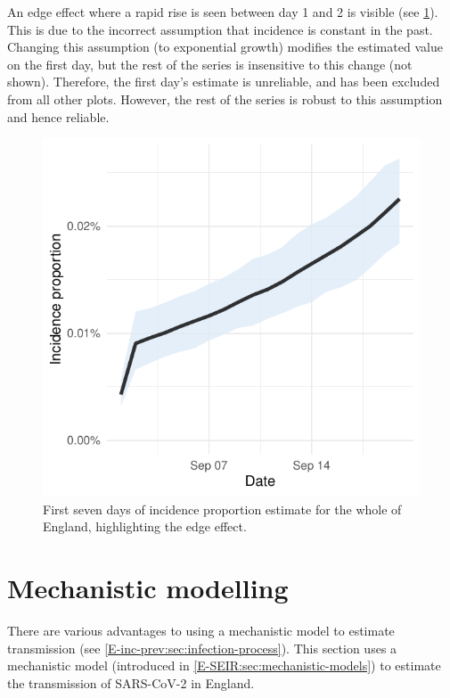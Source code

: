 \documentclass[thesis.tex]{subfiles}
\begin{document}
An edge effect where a rapid rise is seen between day 1 and 2 is visible (see \cref{transmission:fig:backcalc-start-effect}).
This is due to the incorrect assumption that incidence is constant in the past.
Changing this assumption (\eg to exponential growth) modifies the estimated value on the first day, but the rest of the series is insensitive to this change (not shown).
Therefore, the first day's estimate is unreliable, and has been excluded from all other plots.
However, the rest of the series is robust to this assumption and hence reliable.
\begin{figure}
    \centering \includegraphics{transmission/backcalc-start-effect}
    \caption[Edge effects in backcalculation method]{%
        First seven days of incidence proportion estimate for the whole of England, highlighting the edge effect.
    }
    \label{transmission:fig:backcalc-start-effect}
\end{figure}

\section{Mechanistic modelling} \label{SEIR}

There are various advantages to using a mechanistic model to estimate transmission (see \cref{E-inc-prev:sec:infection-process}).
This section uses a mechanistic model (introduced in \cref{E-SEIR:sec:mechanistic-models}) to estimate the transmission of SARS-CoV-2 in England.
\end{document}
